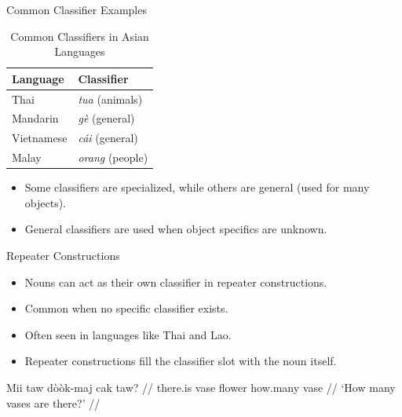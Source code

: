 \documentclass{beamer}
\begin{document}
\begin{frame}{Common Classifier Examples}
\begin{table}
\begin{tabular}{|l|l|}
\hline
\textbf{Language} & \textbf{Classifier} \\
\hline
Thai & \textit{tua} (animals) \\
Mandarin & \textit{gè} (general) \\
Vietnamese & \textit{cái} (general) \\
Malay & \textit{orang} (people) \\
\hline
\end{tabular}
\caption{Common Classifiers in Asian Languages}
\end{table}
\begin{itemize}
    \item Some classifiers are specialized, while others are general (used for many objects).
    \item General classifiers are used when object specifics are unknown.
\end{itemize}
\end{frame}

\begin{frame}{Repeater Constructions}
\begin{itemize}
    \item Nouns can act as their own classifier in repeater constructions.
    \item Common when no specific classifier exists.
    \item Often seen in languages like Thai and Lao.
    \item Repeater constructions fill the classifier slot with the noun itself.
\end{itemize}
\ex
\begingl
\gla Mii taw dòòk-maj cak taw? //
\glb there.is vase flower how.many vase //
\glft ‘How many vases are there?’ //
\endgl
\xe
\end{frame}

\end{document}
